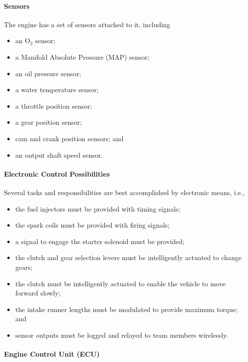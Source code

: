 \paragraph{Sensors}

The engine has a set of sensors attached to it, including

\begin{itemize}
\item an O$_{2}$ sensor;
\item a Manifold Absolute Pressure (MAP) sensor; 
\item an oil pressure sensor;
\item a water temperature sensor;
\item a throttle position sensor;
\item a gear position sensor;
\item cam and crank position sensors; and
\item an output shaft speed sensor.
\end{itemize}

\paragraph{Electronic Control Possibilities}

Several tasks and responsibilities are best accomplished by electronic means, i.e.,

\begin{itemize}
\item the fuel injectors must be provided with timing signals;
\item the spark coils must be provided with firing signals;
\item a signal to engage the starter solenoid must be provided;
\item the clutch and gear selection levers must be intelligently actuated to change gears; 
\item the clutch must be intelligently actuated to enable the vehicle to move forward slowly;
\item the intake runner lengths must be modulated to provide maximum torque; and
\item sensor outputs must be logged and relayed to team members wirelessly.
\end{itemize}

\paragraph{Engine Control Unit (ECU)}

